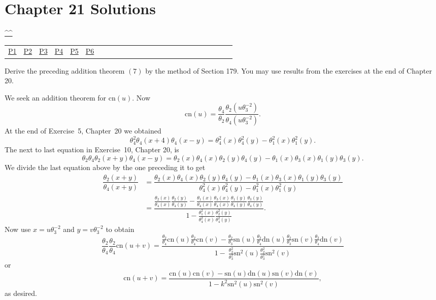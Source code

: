 \section{Chapter 21 Solutions}
\begin{center}\hyperref[toc]{\^{}\^{}}\end{center}
\begin{center}\begin{tabular}{lllllllllllllllllllllllll}
\hyperref[problem1chapter21]{P1} & \hyperref[problem2chapter21]{P2} & \hyperref[problem3chapter21]{P3} & \hyperref[problem4chapter21]{P4} & \hyperref[problem5chapter21]{P5} & \hyperref[problem6chapter21]{P6} 
\end{tabular}\end{center}
\setcounter{problem}{0}
\setcounter{solution}{0}
\begin{problem}\label{problem1chapter21}
Derive the preceding addition theorem $(7)$ by the method of Section 179. You may use results from the exercises at the end of Chapter 20.
\end{problem}
\begin{solution}
We seek an addition theorem for $\mathrm{cn}(u)$.
Now
$$\mathrm{cn}(u) = \dfrac{\theta_4}{\theta_2} \dfrac{\theta_2(u\theta_3^{-2})}{\theta_4(u\theta_3^{-2})}.$$
At the end of Exercise~5, Chapter~20 we obtained
$$\theta_4^2 \theta_4(x+4) \theta_4(x-y) = \theta_4^2(x) \theta_4^2(y) - \theta_1^2(x) \theta_1^2(y).$$
The next to last equation in Exercise~10, Chapter 20, is 
$$\theta_2 \theta_4 \theta_2(x+y) \theta_4(x-y) = \theta_2(x) \theta_4(x) \theta_2(y) \theta_4(y) - \theta_1(x) \theta_3(x) \theta_1(y) \theta_3(y).$$
We divide the last equation above by the one preceding it to get
$$\begin{array}{ll}
\dfrac{\theta_2(x+y)}{\theta_4(x+y)} &= \dfrac{\theta_2(x) \theta_4(x) \theta_2(y) \theta_4(y) - \theta_1(x) \theta_3(x) \theta_1(y) \theta_3(y)}{\theta_4^2(x) \theta_4^2(y) - \theta_1^2(x) \theta_1^2(y)} \\
&=\dfrac{\frac{\theta_2(x)}{\theta_4(x)} \frac{\theta_2(y)}{\theta_4(y)} - \frac{\theta_1(x)}{\theta_4(x)} \frac{\theta_3(x)}{\theta_4(x)} \frac{\theta_1(y)}{\theta_4(y)} \frac{\theta_3(y)}{\theta_4(y)}}{1 - \frac{\theta_1^2(x)}{\theta_4^2(x)} \frac{\theta_2^2(y)}{\theta_4^2(y)}}.
\end{array}$$
Now use $x = u\theta_3^{-2}$ and $y = v\theta_3^{-2}$ to obtain
$$\dfrac{\theta_2}{\theta_4} \dfrac{\theta_2}{\theta_4} \mathrm{cn}(u+v) = \dfrac{\frac{\theta_2}{\theta_4} \mathrm{cn}(u) \frac{\theta_2}{\theta_4} \mathrm{cn}(v) - \frac{\theta_2}{\theta_3} \mathrm{\mathrm{sn}}(u) \frac{\theta_3}{\theta_4} \mathrm{dn}(u) \frac{\theta_2}{\theta_3} \mathrm{\mathrm{sn}}(v)\frac{\theta_3}{\theta_4} \mathrm{dn}(v)}{1 -\ \frac{\theta_2^2}{\theta_3^2} \mathrm{\mathrm{sn}}^2(u) \frac{\theta_2^2}{\theta_3^2}\mathrm{\mathrm{sn}}^2(v)}$$
or
$$\mathrm{cn}(u+v) = \dfrac{\mathrm{cn}(u)\mathrm{cn}(v) - \mathrm{\mathrm{sn}}(u)\mathrm{dn}(u) \mathrm{\mathrm{sn}}(v) \mathrm{dn}(v)}{1 - k^2 \mathrm{\mathrm{sn}}^2(u) \mathrm{\mathrm{sn}}^2(v)},$$
as desired.
\end{solution}

